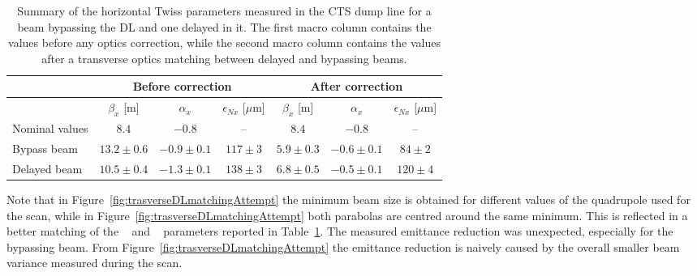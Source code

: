 \begin{table}[htbp]
\centering
\begin{tabular}{l c c c | c c c}
\hline
               & \multicolumn{3}{c|}{Before correction}              & \multicolumn{3}{c}{After correction} \\
\hline
                & $\beta_x$  [m]  &  $\alpha_x$     &  $\epsilon_{Nx}$   [$\mu$m]   & $\beta_x$  [m]  &  $\alpha_x$     &  $\epsilon_{Nx}$   [$\mu$m] \\
\hline
Nominal values  & $8.4$           & $-0.8$          & --             & $8.4$       & $-0.8$       & --    \\
Bypass beam     & $13.2 \pm 0.6$  & $-0.9 \pm 0.1$  & $117 \pm 3$    & $5.9 \pm 0.3$   & $-0.6 \pm 0.1$   & $84 \pm 2$ \\
Delayed beam    & $10.5 \pm 0.4$  & $-1.3 \pm 0.1$  & $138 \pm 3$    & $6.8 \pm 0.5$   & $-0.5 \pm 0.1$   & $120 \pm 4$ \\
\hline 
\end{tabular}
\caption{Summary of the horizontal Twiss parameters measured in the CTS dump line for a beam bypassing
         the DL and one delayed in it.
         The first macro column contains the values before any optics correction, while the second
         macro column contains the values after a transverse optics matching between delayed and
         bypassing beams.}
\label{tab:quadMatchingDLfirst}
\end{table}
%
Note that in Figure~\ref{fig:trasverseDLmatchingAttempt}
the minimum beam size is obtained for different values of the quadrupole used for the scan, while in
Figure~\ref{fig:trasverseDLmatchingAttempt} both parabolas
are centred around the same minimum.
This is reflected in a better matching of the \textbeta~ and \textalpha~ parameters reported in
Table~\ref{tab:quadMatchingDLfirst}.
The measured emittance reduction was unexpected, especially for the bypassing beam.
From Figure~\ref{fig:trasverseDLmatchingAttempt} the emittance reduction is naively caused by the
overall smaller beam variance measured during the scan.

